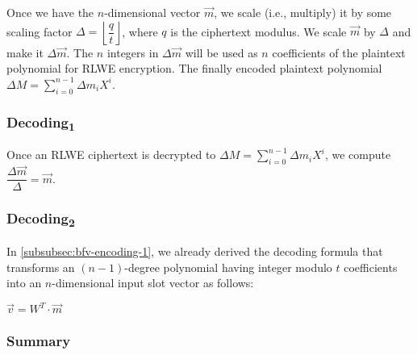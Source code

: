 Once we have the $n$-dimensional vector $\vec{m}$, we scale (i.e., multiply) it by some scaling factor $\Delta = \left\lfloor \dfrac{q}{t} \right\rfloor$, where $q$ is the ciphertext modulus. We scale $\vec{m}$ by $\Delta$ and make it $\Delta \vec{m}$. 
The $n$ integers in $\Delta\vec{m}$ will be used as $n$ coefficients of the plaintext polynomial for RLWE encryption. The finally encoded plaintext polynomial $\Delta M = \sum\limits_{i=0}^{n-1}$$\Delta m_iX^i$. 


\subsubsection{\textsf{Decoding\textsubscript{1}}}  
\label{subsubsec:bfv-enc-dec-decoding1} 

Once an RLWE ciphertext is decrypted to $\Delta M = \sum\limits_{i=0}^{n-1}$$\Delta m_iX^i$, we compute $\dfrac{\Delta\vec{m}}{\Delta} = \vec{m}$.




\subsubsection{\textsf{Decoding\textsubscript{2}}}  


In \autoref{subsubsec:bfv-encoding-1}, we already derived the decoding formula that transforms an $(n-1)$-degree polynomial having integer modulo $t$ coefficients into an $n$-dimensional input slot vector as follows: 

$\vec{v} = W^T \cdot \vec{m}$


\subsubsection{Summary}
\label{subsubsec:bfv-encoding-summary}

